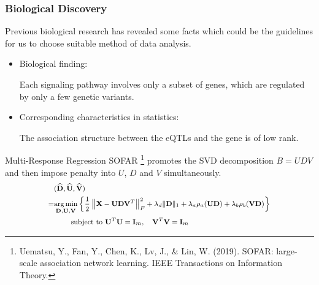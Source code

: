 \begin{frame}\frametitle{Biological Discovery}
    Previous biological research has revealed some facts which could be the guidelines for us to choose suitable method of data analysis.

    \begin{itemize}
        
        \item Biological finding: 
        
              Each signaling pathway involves only a subset of genes, which are regulated by only a few genetic variants.

        \item Corresponding characteristics in statistics: 
        
              The association structure between the eQTLs and the gene is of low rank.
    \end{itemize}
\end{frame}

\begin{frame}{Multi-Response Regression}
    SOFAR \footnote[1]{Uematsu, Y., Fan, Y., Chen, K., Lv, J., \& Lin, W. (2019). SOFAR: large-scale association network learning. IEEE Transactions on Information Theory.} 
    promotes the SVD decomposition $B= UDV$ and then impose penalty into $U$, $D$ and $V$ simultaneously. 
    \begin{equation*}\footnotesize
        \begin{split}
            & (\widehat{\mathbf{D}}, \widehat{\mathbf{U}}, \widehat{\mathbf{V}}) \\
            = & \underset{\mathbf{D}, \mathbf{U}, \mathbf{V}}{\arg \min }\left\{\frac{1}{2} \left\|\mathbf{X}-\mathbf{U D V}^{T}\right\|_{F}^{2}+\lambda_{d}\|\mathbf{D}\|_{1}+\lambda_{a} \rho_{a}(\mathbf{U D})+\lambda_{b} \rho_{b}(\mathbf{V D})\right\} \\ 
            & \quad\quad \text { subject to } \mathbf{U}^{T} \mathbf{U}=\mathbf{I}_{m}, \quad \mathbf{V}^{T} \mathbf{V}=\mathbf{I}_{m} 
        \end{split}
    \end{equation*}
\end{frame}

